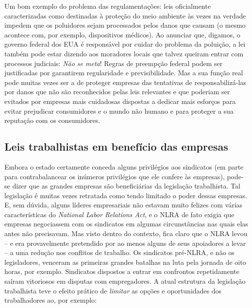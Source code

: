 Um bom exemplo do problema das regulamentações: leis oficialmente caracterizadas como destinadas à proteção do meio ambiente às vezes na verdade impedem que os poluidores sejam processados pelos danos que causam (o mesmo acontece com, por exemplo, dispositivos médicos). Ao anunciar que, digamos, o governo federal dos EUA é responsável por cuidar do problema da poluição, a lei também pode estar dizendo aos moradores locais que talvez queiram entrar com processos judiciais: \emph{Não se meta}! Regras de preempção federal podem ser justificadas por garantirem regularidade e previsibilidade. Mas a sua função real pode muitas vezes ser a de proteger empresas das tentativas de responsabilizá-las por danos que não são reconhecidos pelas leis relevantes e que poderiam ser evitados por empresas mais cuidadosas dispostas a dedicar mais esforços para evitar prejudicar consumidores e o mundo não humano e para proteger a sua reputação com os consumidores.

\subsection*{Leis trabalhistas em benefício das empresas}

Embora o estado certamente conceda alguns privilégios aos sindicatos (em parte para contrabalancear os inúmeros privilégios que ele confere às empresas), pode-se dizer que as grandes empresas são beneficiárias da legislação trabalhista. Tal legislação é muitas vezes retratada como tendo limitado o poder dessas empresas. E, sem dúvida, alguns líderes empresariais não estavam muito felizes com várias características do \emph{National Labor Relations Act}, e o NLRA de fato exigia que empresas negociassem com os sindicatos em algumas circunstâncias nas quais elas antes não precisavam. Mas visto dentro do contexto, fica claro que o NLRA levou -- e era provavelmente pretendido por ao menos alguns de seus apoiadores a levar -- a uma redução nos conflitos de trabalho. Os sindicatos pré-NLRA, e não os legisladores, venceram as primeiras grandes batalhas na luta pela jornada de oito horas, por exemplo. Sindicatos dispostos a entrar em confrontos repetidamente saíram vitoriosos em disputas com empregadores. A atual estrutura da legislação trabalhista teve o efeito prático de \emph{limitar} as opções e oportunidades dos trabalhadores ao, por exemplo:

